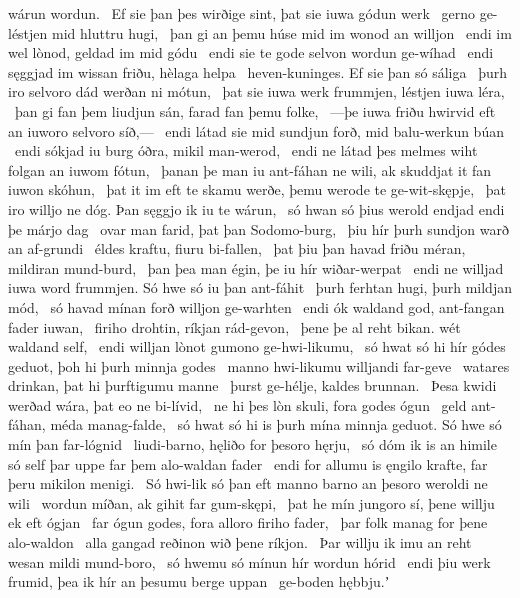 wárun wordun. \hld\ Ef sie þan þes wirðige sint,
þat sie iuwa gódun werk \hld\ gerno ge-léstjen
mid hluttru hugi, \hld\ þan gi an þemu húse mid im
wonod an willjon \hld\ endi im wel lònod,
geldad im mid gódu \hld\ endi sie te gode selvon
wordun ge-wíhad \hld\ endi sęggjad im wissan friðu,
hèlaga helpa \hld\ heven-kuninges.
Ef sie þan só sáliga \hld\ þurh iro selvoro dád
werðan ni mótun, \hld\ þat sie iuwa werk frummjen,
léstjen iuwa léra, \hld\ þan gi fan þem liudjun sán,
farad fan þemu folke, \hld\ —þe iuwa friðu hwirvid
eft an iuworo selvoro síð,— \hld\ endi látad sie mid sundjun forð,
mid balu-werkun búan \hld\ endi sókjad iu burg óðra,
mikil man-werod, \hld\ endi ne látad þes melmes wiht
folgan an iuwom fótun, \hld\ þanan þe man iu ant-fáhan ne wili,
ak skuddjat it fan iuwon skóhun, \hld\ þat it im eft te skamu werðe,
þemu werode te ge-wit-skępje, \hld\ þat iro willjo ne dóg.
Þan sęggjo ik iu te wárun, \hld\ só hwan só þius werold endjad
endi þe márjo dag \hld\ ovar man farid,
þat þan Sodomo-burg, \hld\ þiu hír þurh sundjon warð
an af-grundi \hld\ éldes kraftu,
fiuru bi-fallen, \hld\ þat þiu þan havad friðu méran,
mildiran mund-burd, \hld\ þan þea man égin,
þe iu hír wiðar-werpat \hld\ endi ne willjad iuwa word frummjen.
Só hwe só iu þan ant-fáhit \hld\ þurh ferhtan hugi,
þurh mildjan mód, \hld\ só havad mínan forð
willjon ge-warhten \hld\ endi ók waldand god,
ant-fangan fader iuwan, \hld\ firiho drohtin,
ríkjan rád-gevon, \hld\ þene þe al reht bikan.
wét waldand self, \hld\ endi willjan lònot
gumono ge-hwi-likumu, \hld\ só hwat só hi hír gódes geduot,
þoh hi þurh minnja godes \hld\ manno hwi-likumu
willjandi far-geve \hld\ watares drinkan,
þat hi þurftigumu manne \hld\ þurst ge-hélje,
kaldes brunnan. \hld\ Þesa kwidi werðad wára,
þat eo ne bi-lívid, \hld\ ne hi þes lòn skuli,
fora godes ógun \hld\ geld ant-fáhan,
méda manag-falde, \hld\ só hwat só hi is þurh mína minnja geduot.
Só hwe só mín þan far-lógnid \hld\ liudi-barno,
hęliðo for þesoro hęrju, \hld\ só dóm ik is an himile só self
þar uppe far þem alo-waldan fader \hld\ endi for allumu is ęngilo krafte,
far þeru mikilon menigi. \hld\ Só hwi-lik só þan eft manno barno
an þesoro weroldi ne wili \hld\ wordun míðan,
ak gihit far gum-skępi, \hld\ þat he mín jungoro sí,
þene willju ek eft ógjan \hld\ far ógun godes,
fora alloro firiho fader, \hld\ þar folk manag
for þene alo-waldon \hld\ alla gangad
reðinon wið þene ríkjon. \hld\ Þar willju ik imu an reht wesan
mildi mund-boro, \hld\ só hwemu só mínun hír
wordun hórid \hld\ endi þiu werk frumid,
þea ik hír an þesumu berge uppan \hld\ ge-boden hębbju.ʼ
